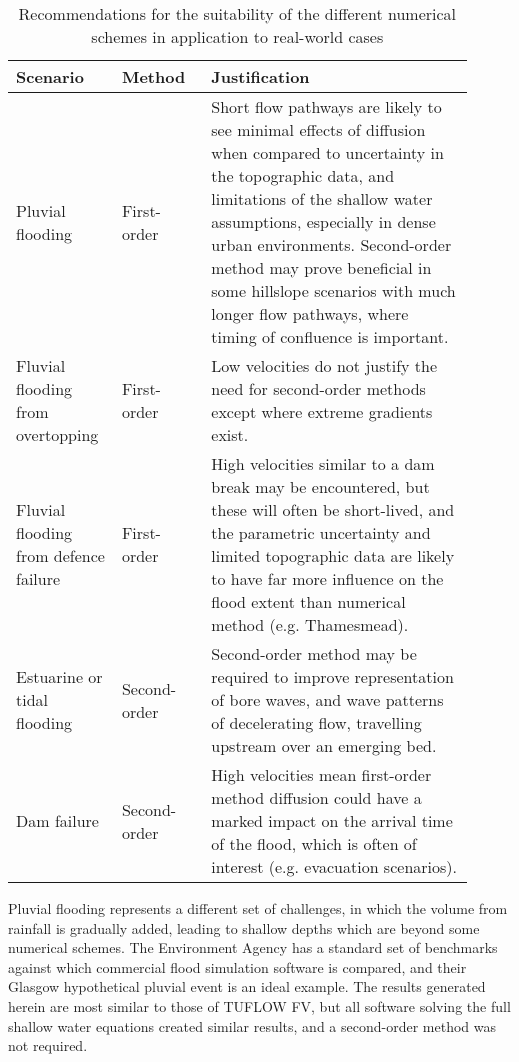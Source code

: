 \begin{table*}[tpb]
	\small
	\centering
	\caption{Recommendations for the suitability of the different numerical schemes in application to real-world cases}
	\label{MethodRecommendations}
	\begin{tabular}{p{0.2\linewidth}p{0.18\linewidth}p{0.53\linewidth}}
		\hline
		Scenario 											& Method				& Justification \\
		\hline
		Pluvial flooding									& First-order			& Short flow pathways are likely to see minimal effects of diffusion when compared to uncertainty in the topographic data, and limitations of the shallow water assumptions, especially in dense urban environments. Second-order method may prove beneficial in some hillslope scenarios with much longer flow pathways, where timing of confluence is important. \\
		\raggedright{Fluvial flooding from overtopping}		& First-order			& Low velocities do not justify the need for second-order methods except where extreme gradients exist. \\
		\raggedright{Fluvial flooding from defence failure}	& First-order			& High velocities similar to a dam break may be encountered, but these will often be short-lived, and the parametric uncertainty and limited topographic data are likely to have far more influence on the flood extent than numerical method (e.g. Thamesmead). \\
		\raggedright{Estuarine or tidal flooding}			& Second-order			& Second-order method may be required to improve representation of bore waves, and wave patterns of decelerating flow, travelling upstream over an emerging bed. \\
		Dam failure											& Second-order			& High velocities mean first-order method diffusion could have a marked impact on the arrival time of the flood, which is often of interest (e.g. evacuation scenarios). \\
		\hline
	\end{tabular}
\end{table*}

Pluvial flooding represents a different set of challenges, in which the volume from rainfall is gradually added, leading to shallow depths which are beyond some numerical schemes. The Environment Agency has a standard set of benchmarks against which commercial flood simulation software is compared, and their Glasgow hypothetical pluvial event is an ideal example. The results generated herein are most similar to those of TUFLOW FV, but all software solving the full shallow water equations created similar results, and a second-order method was not required. 

